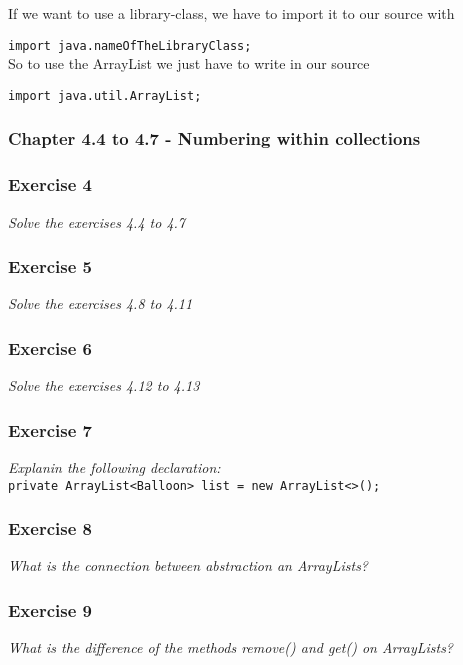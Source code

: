 \noindent
If we want to use a library-class, we have to import it to our source with

\lstinline{import java.nameOfTheLibraryClass;} \\

\noindent
So to use the ArrayList we just have to write in our source 

\lstinline{import java.util.ArrayList;} 

\subsubsection{Chapter 4.4 to 4.7 - Numbering within collections}

\subsubsection*{Exercise 4}
\textit{Solve the exercises 4.4 to 4.7}\\

\subsubsection*{Exercise 5}
\textit{Solve the exercises 4.8 to 4.11}\\

\subsubsection*{Exercise 6}
\textit{Solve the exercises 4.12 to 4.13}\\

\subsubsection*{Exercise 7}
\textit{Explanin the following declaration:}\\
\lstinline?private ArrayList<Balloon> list = new ArrayList<>();?\\

\subsubsection*{Exercise 8}
\textit{What is the connection between abstraction an ArrayLists?}\\

\subsubsection*{Exercise 9}
\textit{What is the difference of the methods remove() and get() on
ArrayLists?}\\

